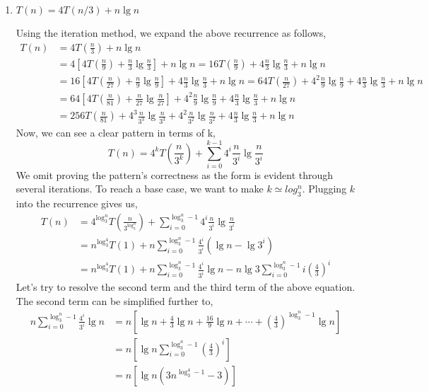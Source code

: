 \documentclass[11pt]{article}
\theoremstyle{definition}
\theoremstyle{theorem}
\newcommand{\solution}{\medskip\noindent{\color{DarkBlue}\textbf{Solution:}}}
\begin{document}
\begin{enumerate}[label=(\alph*)]

\item $T(n) = 4T(n/3) + n\lg n$

\solution

Using the iteration method, we expand the above recurrence as follows,
\[
\begin{split}
T(n) &= 4T(\frac{n}{3}) + n\lg n \\
&= 4[4T(\frac{n}{9}) + \frac{n}{3} \lg \frac{n}{3}] + n \lg n 
= 16 T(\frac{n}{9}) + 4 \frac{n}{3} \lg \frac{n}{3} + n \lg n \\
&= 16[4T(\frac{n}{27}) + \frac{n}{9} \lg \frac{n}{9}] +  4 \frac{n}{3} \lg \frac{n}{3} + n \lg n
= 64 T(\frac{n}{27}) + 4^2 \frac{n}{9} \lg \frac{n}{9} + 4 \frac{n}{3} \lg \frac{n}{3} + n \lg n \\
&= 64[4T(\frac{n}{81}) + \frac{n}{27} \lg \frac{n}{27}] + 4^2 \frac{n}{9} \lg \frac{n}{9} + 4 \frac{n}{3} \lg \frac{n}{3} + n \lg n \\
&= 256T(\frac{n}{81}) + 4^3 \frac{n}{3^3} \lg \frac{n}{3^3} + 4^2 \frac{n}{3^2} \lg \frac{n}{3^2} + 4 \frac{n}{3} \lg \frac{n}{3} + n \lg n 
\end{split}
\]
Now, we can see a clear pattern in terms of k,
\[
T(n) = 4^k T(\frac{n}{3^k}) + \sum_{i=0}^{k-1} 4^i \frac{n}{3^i} \lg \frac{n}{3^i}
\]
We omit proving the pattern's correctness as the form is evident through several iterations. To reach a base case, we want to make $k	\simeq log_3^n$. Plugging $k$ into the recurrence gives us,
\[
\begin{split}
T(n) &= 4^{\log_3^n} T(\frac{n}{3^{\log_3^n}}) + \sum_{i=0}^{\log_3^n-1} 4^i \frac{n}{3^i} \lg \frac{n}{3^i} \\
&= n^{\log_3^4} T(1) + n \sum_{i=0}^{\log_3^n-1} \frac{4^i}{3^i} (\lg n - \lg 3^i) \\
&= n^{\log_3^4} T(1) + n \sum_{i=0}^{\log_3^n-1} \frac{4^i}{3^i} \lg n - n \lg 3 \sum_{i=0}^{\log_3^n-1} i (\frac{4}{3})^i
\end{split}
\]
Let's try to resolve the second term and the third term of the above equation. The second term can be simplified further to,
\[
\begin{split}
n \sum_{i=0}^{\log_3^n-1} \frac{4^i}{3^i} \lg n 
&= n[\lg n + \frac{4}{3} \lg n + \frac{16}{9} \lg n + \cdots + (\frac{4}{3})^{\log_3^n - 1} \lg n] \\
&= n[\lg n \sum_{i=0}^{\log_3^n - 1} (\frac{4}{3})^i] \\
&= n[\lg n (3n^{\log_3^4 - 1} - 3)] \\

\end{split}\]
\end{enumerate}
\end{document}
